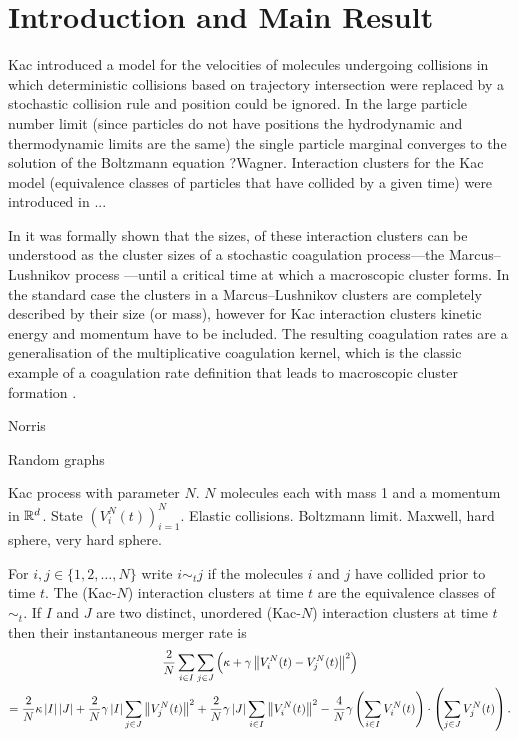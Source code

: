 \section{Introduction and Main Result}

Kac \cite{K56} introduced a model for the velocities of molecules undergoing collisions in which deterministic collisions based on trajectory intersection were replaced by a stochastic collision rule and position could be ignored.
In the large particle number limit (since particles do not have positions the hydrodynamic and thermodynamic limits are the same) the single particle marginal converges to the solution of the Boltzmann equation ?Wagner.
Interaction clusters for the Kac model (equivalence classes of particles that have collided by a given time) were introduced in \cite{GKSZ08} ...

In \cite{PSW17} it was formally shown that the sizes, of these interaction clusters can be understood as the cluster sizes of a stochastic coagulation process---the Marcus--Lushnikov process \cite{L78}---until a critical time at which a macroscopic cluster forms.
In the standard case the clusters in a Marcus--Lushnikov clusters are completely described by their size (or mass), however for Kac interaction clusters kinetic energy and momentum have to be included.
The resulting coagulation rates are a generalisation of the multiplicative coagulation kernel, which is the classic example of a coagulation rate definition that leads to macroscopic cluster formation \cite{L78,A99}.

Norris

Random graphs

Kac process with parameter $N$.
$N$ molecules each with mass 1 and a momentum in $\mathbb{R}^d$.
State $\left(V_i^N(t)\right)_{i=1}^N$.
Elastic collisions.
Boltzmann limit.
Maxwell, hard sphere, very hard sphere.


For $i,j\in \{1,2,\dotsc, N \}$ write $i \sim_t j$ if the molecules $i$ and $j$ have collided prior to time $t$.
The (Kac-$N$) interaction clusters at time $t$ are the equivalence classes of $\sim_t$.
If $I$ and $J$ are two distinct, unordered (Kac-$N$) interaction clusters at time $t$ then their instantaneous merger rate is
\begin{multline}\label{e:cluster-merge-rate}
    \frac2N\sum_{i\in I}\sum_{j\in J}
     \left(\kappa + \gamma \left\lVert{V_i^N(t) - V_j^N(t)}\right\rVert^2 \right)\\
    =
    \frac2N\kappa \left\lvert{I}\right\rvert\left\lvert{J}\right\rvert
    +\frac2N\gamma \left\lvert{I}\right\rvert \sum_{j\in J}\left\lVert{V_j^N(t)}\right\rVert^2
    +\frac2N\gamma \left\lvert{J}\right\rvert \sum_{i\in I}\left\lVert{V_i^N(t)}\right\rVert^2
    -\frac4N\gamma \left(\sum_{i\in I}V_i^N(t)\right)\cdot
    \left(\sum_{j\in J}V_j^N(t)\right).
\end{multline}